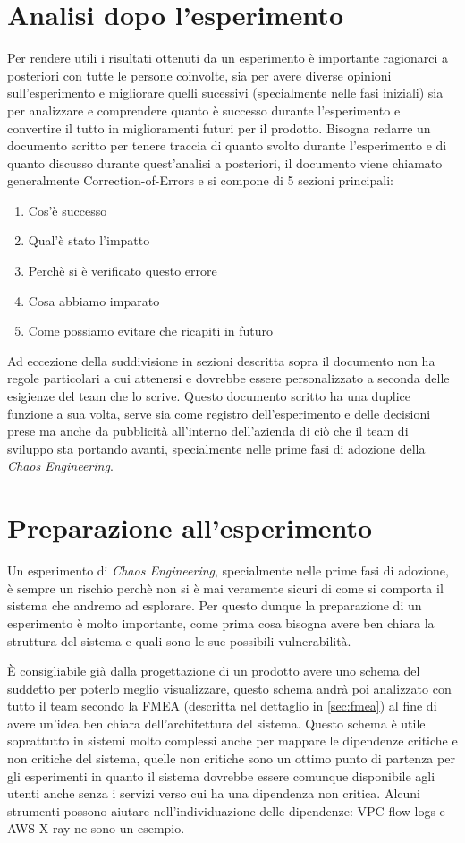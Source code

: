 \section{Analisi dopo l'esperimento}
Per rendere utili i risultati ottenuti da un esperimento è importante ragionarci a posteriori con tutte le persone coinvolte, sia per avere diverse opinioni sull'esperimento e migliorare quelli sucessivi (specialmente nelle fasi iniziali) sia per analizzare e comprendere quanto è successo durante l'esperimento e convertire il tutto in miglioramenti futuri per il prodotto.
Bisogna redarre un documento scritto per tenere traccia di quanto svolto durante l'esperimento e di quanto discusso durante quest'analisi a posteriori, il documento viene chiamato generalmente Correction-of-Errors e si compone di 5 sezioni principali:
\begin{enumerate}
    \item Cos'è successo
    \item Qual'è stato l'impatto
    \item Perchè si è verificato questo errore
    \item Cosa abbiamo imparato
    \item Come possiamo evitare che ricapiti in futuro
\end{enumerate}
Ad eccezione della suddivisione in sezioni descritta sopra il documento non ha regole particolari a cui attenersi e dovrebbe essere personalizzato a seconda delle esigienze del team che lo scrive.
Questo documento scritto ha una duplice funzione a sua volta, serve sia come registro dell'esperimento e delle decisioni prese ma anche da pubblicità all'interno dell'azienda di ciò che il team di sviluppo sta portando avanti, specialmente nelle prime fasi di adozione della \textit{Chaos Engineering}.

\section{Preparazione all'esperimento}
Un esperimento di \textit{Chaos Engineering}, specialmente nelle prime fasi di adozione, è sempre un rischio perchè non si è mai veramente sicuri di come si comporta il sistema che andremo ad esplorare.
Per questo dunque la preparazione di un esperimento è molto importante, come prima cosa bisogna avere ben chiara la struttura del sistema e quali sono le sue possibili vulnerabilità.

È consigliabile già dalla progettazione di un prodotto avere uno schema del suddetto per poterlo meglio visualizzare, questo schema andrà poi analizzato con tutto il team secondo la FMEA (descritta nel dettaglio in \ref{sec:fmea}) al fine di avere un'idea ben chiara dell'architettura del sistema.
Questo schema è utile soprattutto in sistemi molto complessi anche per mappare le dipendenze critiche e non critiche del sistema, quelle non critiche sono un ottimo punto di partenza per gli esperimenti in quanto il sistema dovrebbe essere comunque disponibile agli utenti anche senza i servizi verso cui ha una dipendenza non critica.
Alcuni strumenti possono aiutare nell'individuazione delle dipendenze: VPC flow logs e AWS X-ray ne sono un esempio.

